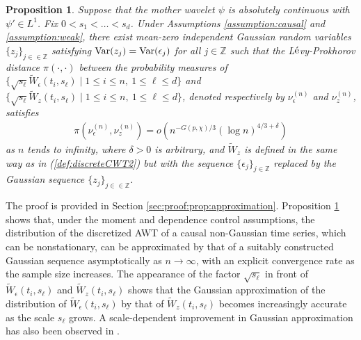 \documentclass{amsart}
\newtheorem{Proposition}{Proposition}
\begin{document}
\begin{Proposition}\label{prop:approximation}
Suppose that the mother wavelet $\psi$ is absolutely continuous with $\psi'\in L^{1}$.
Fix $0<s_1<\ldots<s_d$.
Under Assumptions  \ref{assumption:causal} and \ref{assumption:weak},
there exist mean-zero independent Gaussian random
variables $\{z_{j}\}_{j\in \in \mathbb{Z}}$ satisfying $\textup{Var}(z_{j})=\textup{Var}(\epsilon_{j})$
for all $j\in \mathbb{Z}$ such that
the L$\acute{\textup{e}}$vy-Prokhorov distance $\pi(\cdot,\cdot)$ between the probability measures of $\{\sqrt{s_{\ell}}\widetilde{W}_{\epsilon}(t_{i},s_{\ell})\mid 1\leq i\leq n,\ 1\leq \ell \leq d\}$
and $\{\sqrt{s_{\ell}}\widetilde{W}_{z}(t_{i},s_{\ell})\mid 1\leq i\leq n,\ 1\leq \ell \leq d\}$,
denoted respectively by $\nu_{\epsilon}^{(n)}$
and $\nu_{z}^{(n)}$, satisfies
\begin{align}\label{prop:LP_bound}
\pi(\nu_{\epsilon}^{(n)},\nu_{z}^{(n)})=o\left(n^{-G(p,\chi)/3}(\log n)^{4/3+\delta}\right)
\end{align}
as $n$ tends to infinity,
where $\delta>0$ is arbitrary, and $\widetilde{W}_{z}$ is defined in the same way as in (\ref{def:discreteCWT2})
but with the sequence $\{\epsilon_{j}\}_{j\in \mathbb{Z}}$ replaced by the Gaussian sequence
$\{z_{j}\}_{j\in \in \mathbb{Z}}$.
\end{Proposition}




The proof is provided in Section \ref{sec:proof:prop:approximation}.
Proposition \ref{prop:approximation} shows that, under the moment and dependence control assumptions, the distribution of the discretized AWT of a causal non-Gaussian time series, which can be nonstationary, can be approximated by that of a suitably constructed Gaussian sequence asymptotically as $n\to \infty$, with an explicit convergence rate as the sample size increases.
The appearance of the factor $\sqrt{s_{\ell}}$ in front of $\widetilde{W}_{\epsilon}(t_{i},s_{\ell})$ and $\widetilde{W}_{z}(t_{i},s_{\ell})$ shows that the Gaussian approximation of the distribution of $\widetilde{W}_{\epsilon}(t_{i},s_{\ell})$ by that of $\widetilde{W}_{z}(t_{i},s_{\ell})$ becomes increasingly accurate as the scale $s_{\ell}$ grows. A scale-dependent improvement in Gaussian approximation has also been observed in \cite{fageot2015wavelet}.
\end{document}
